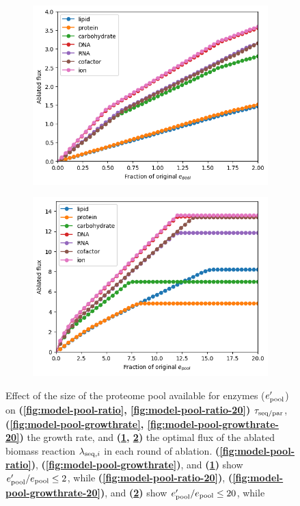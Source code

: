 \begin{figure}
  \begin{subfigure}[htpb]{0.45\textwidth}
   \centering
   \includegraphics[width=\textwidth]{epool_ec_components}
   \caption{
   }
   \label{fig:model-pool-ablated}
  \end{subfigure}%
  \begin{subfigure}[htpb]{0.45\textwidth}
   \centering
   \includegraphics[width=\textwidth]{epool_ec_components_20}
   \caption{
   }
   \label{fig:model-pool-ablated-20}
  \end{subfigure}

  \caption{
    Effect of the size of the proteome pool available for enzymes ($e_{\mathrm{pool}}^{\prime}$) on \textbf{(\ref{fig:model-pool-ratio}, \ref{fig:model-pool-ratio-20})} $\tau_{\mathrm{seq}/\mathrm{par}}$, \textbf{(\ref{fig:model-pool-growthrate}, \ref{fig:model-pool-growthrate-20})} the growth rate, and \textbf{(\ref{fig:model-pool-ablated}, \ref{fig:model-pool-ablated-20})} the optimal flux of the ablated biomass reaction $\lambda_{\mathrm{seq},i}$ in each round of ablation.
    \textbf{(\ref{fig:model-pool-ratio})}, \textbf{(\ref{fig:model-pool-growthrate})}, and \textbf{(\ref{fig:model-pool-ablated})} show $e_{\mathrm{pool}}^{\prime}/e_{\mathrm{pool}} \leq 2$, while
    \textbf{(\ref{fig:model-pool-ratio-20})}, \textbf{(\ref{fig:model-pool-growthrate-20})}, and \textbf{(\ref{fig:model-pool-ablated-20})} show $e_{\mathrm{pool}}^{\prime}/e_{\mathrm{pool}} \leq 20$, while
  }
  \label{fig:model-pool}
\end{figure}
